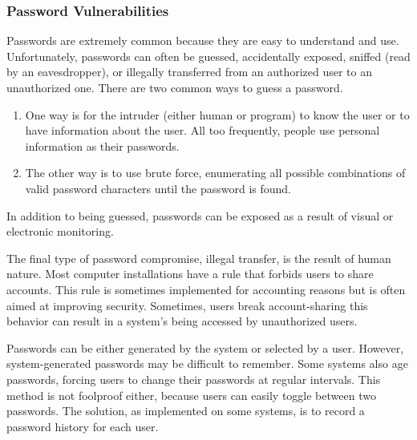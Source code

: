 \subsubsection{Password Vulnerabilities}\label{subsubsec:Password_Vulnerabilities}
Passwords are extremely common because they are easy to understand and use.
Unfortunately, passwords can often be guessed, accidentally exposed, sniffed (read by an eavesdropper), or illegally transferred from an authorized user to an unauthorized one.
There are two common ways to guess a password.
\begin{enumerate}[noitemsep]
\item One way is for the intruder (either human or program) to know the user or to have information about the user.
  All too frequently, people use personal information as their passwords.
\item The other way is to use brute force, enumerating all possible combinations of valid password characters until the password is found.
\end{enumerate}

In addition to being guessed, passwords can be exposed as a result of
visual or electronic monitoring.

The final type of password compromise, illegal transfer, is the result of human nature.
Most computer installations have a rule that forbids users to share accounts.
This rule is sometimes implemented for accounting reasons but is often aimed at improving security.
Sometimes, users break account-sharing this behavior can result in a system’s being accessed by unauthorized users.

Passwords can be either generated by the system or selected by a user.
However, system-generated passwords may be difficult to remember.
Some systems also age passwords, forcing users to change their passwords at regular intervals.
This method is not foolproof either, because users can easily toggle between two passwords.
The solution, as implemented on some systems, is to record a password history for each user.


